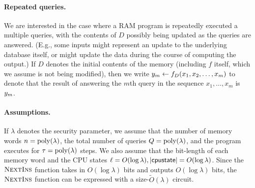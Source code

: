 

\paragraph{Repeated queries.}
We are interested in the case where a RAM program is repeatedly executed a multiple
queries, with the contents of $D$ possibly being updated as the queries are answered.
(E.g., some inputs might represent an update to the underlying database itself, or
might update the data during the course of computing the output.)
If $D$ denotes the initial contents of the memory (including $f$ itself, which we
assume is not being modified), then we write
$y_m \leftarrow f_D(x_1, x_2, \ldots, x_m)$
to denote that the result of answering the $m$th query in the sequence $x_1, \ldots, x_m$
is~$y_m$.



\paragraph{Assumptions.}
If $\lambda$ denotes the security parameter,
we assume that the number of memory words $n = {\rm poly}(\lambda)$,
the total number of queries $Q = {\rm poly}(\lambda)$, and the program executes for
$\tau = {\rm poly}(\lambda)$ steps.
We also assume that the bit-length of each memory word 
and the CPU states $\ell = O(\log \lambda), |\mathsf{cpustate}| = O(\log \lambda)$.
Since the $\textsc{NextIns}$ function takes in $O(\log \lambda)$ bits and
outputs $O(\log \lambda)$ bits, the $\textsc{NextIns}$ function can be expressed with  
a size-$\tilde{O}(\lambda)$ circuit.


